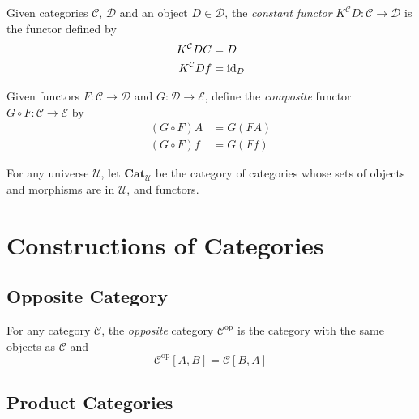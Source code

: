 \begin{df}
    Given categories $\mathcal{C}$, $\mathcal{D}$ and an object $D \in \mathcal{D}$, the \emph{constant functor} $K^\mathcal{C} D : \mathcal{C} \rightarrow \mathcal{D}$ is the functor defined by
    \begin{align*}
        K^\mathcal{C} D C & = D      \\
        K^\mathcal{C} D f & = \mathrm{id}_{D}
    \end{align*}
\end{df}

\begin{df}
Given functors $F : \mathcal{C} \rightarrow \mathcal{D}$ and $G : \mathcal{D} \rightarrow \mathcal{E}$, define the \emph{composite} functor $G \circ F : \mathcal{C} \rightarrow \mathcal{E}$ by
\begin{align*}
(G \circ F) A & = G (F A) \\
(G \circ F) f & = G (F f)
\end{align*}
\end{df}

\begin{df}
For any universe $\mathcal{U}$, let $\mathbf{Cat}_\mathcal{U}$ be the category of categories whose sets of objects and morphisms are in $\mathcal{U}$, and functors.
\end{df}

\chapter{Constructions of Categories}

\section{Opposite Category}

\begin{df}
    For any category $\mathcal{C}$, the \emph{opposite} category $\mathcal{C}^\mathrm{op}$ is the category with the same objects as $\mathcal{C}$ and
    \[ \mathcal{C}^\mathrm{op}[A,B] = \mathcal{C}[B,A] \]
\end{df}

\section{Product Categories}

